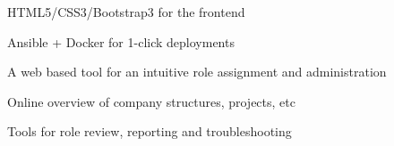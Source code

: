 \documentclass[10pt,A4]{article}
\newcommand{\cvlist}[1] {
	\begin{itemize}{#1}\end{itemize}
}
\begin{document}
\begin{paracol}{2}
\begin{rightcolumn}
{{        		\item{HTML5/CSS3/Bootstrap3 for the frontend}%
        		\item{Ansible + Docker for 1-click deployments}%
    	}}
    	{\cvlist{
    		\item{A web based tool for an intuitive role assignment and administration}%
    		\item{Online overview of company structures, projects, etc}%
    		\item{Tools for role review, reporting and troubleshooting}%
    	}}


\end{rightcolumn}
\end{paracol}
\end{document}
